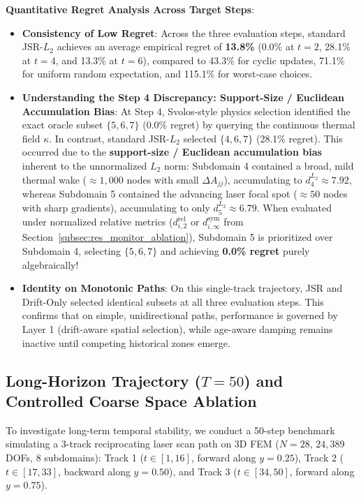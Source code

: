 \documentclass[preprint,12pt,3p]{elsarticle}
\begin{document}
\textbf{Quantitative Regret Analysis Across Target Steps}:
\begin{itemize}
    \item \textbf{Consistency of Low Regret}: Across the three evaluation steps, standard JSR-$L_2$ achieves an average empirical regret of \textbf{13.8\%} (0.0\% at $t=2$, 28.1\% at $t=4$, and 13.3\% at $t=6$), compared to 43.3\% for cyclic updates, 71.1\% for uniform random expectation, and 115.1\% for worst-case choices.
    \item \textbf{Understanding the Step 4 Discrepancy: Support-Size / Euclidean Accumulation Bias}: At Step 4, Svolos-style physics selection identified the exact oracle subset $\{5, 6, 7\}$ (0.0\% regret) by querying the continuous thermal field $\kappa$. In contrast, standard JSR-$L_2$ selected $\{4, 6, 7\}$ (28.1\% regret). This occurred due to the \textbf{support-size / Euclidean accumulation bias} inherent to the unnormalized $L_2$ norm: Subdomain 4 contained a broad, mild thermal wake ($\approx 1{,}000$ nodes with small $\Delta A_{jj}$), accumulating to $d_4^{L_2} \approx 7.92$, whereas Subdomain 5 contained the advancing laser focal spot ($\approx 50$ nodes with sharp gradients), accumulating to only $d_5^{L_2} \approx 6.79$. When evaluated under normalized relative metrics ($d_{i, 2}^{\text{rel}}$ or $d_{i, \infty}^{\text{sym}}$ from Section~\ref{subsec:res_monitor_ablation}), Subdomain 5 is prioritized over Subdomain 4, selecting $\{5, 6, 7\}$ and achieving \textbf{0.0\% regret} purely algebraically!
    \item \textbf{Identity on Monotonic Paths}: On this single-track trajectory, JSR and Drift-Only selected identical subsets at all three evaluation steps. This confirms that on simple, unidirectional paths, performance is governed by Layer 1 (drift-aware spatial selection), while age-aware damping remains inactive until competing historical zones emerge.
\end{itemize}

\subsection{Long-Horizon Trajectory ($T=50$) and Controlled Coarse Space Ablation}
\label{subsec:long_horizon}

To investigate long-term temporal stability, we conduct a 50-step benchmark simulating a 3-track reciprocating laser scan path on 3D FEM ($N=28$, $24,389$ DOFs, 8 subdomains): Track 1 ($t \in [1, 16]$, forward along $y=0.25$), Track 2 ($t \in [17, 33]$, backward along $y=0.50$), and Track 3 ($t \in [34, 50]$, forward along $y=0.75$).
\end{document}
